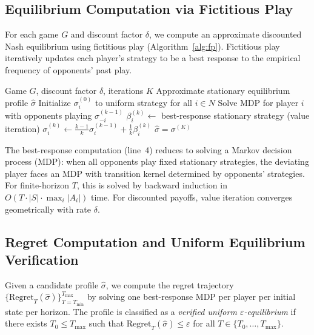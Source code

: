 \documentclass[11pt,a4paper]{article}
\theoremstyle{definition}
\newcommand{\eps}{\varepsilon}
\newcommand{\Regret}{\mathrm{Regret}}
\begin{document}
\subsection{Equilibrium Computation via Fictitious Play}\label{sec:method:fp}

For each game $G$ and discount factor $\delta$, we compute an approximate discounted Nash equilibrium using fictitious play (Algorithm~\ref{alg:fp}).
Fictitious play iteratively updates each player's strategy to be a best response to the empirical frequency of opponents' past play.

\begin{algorithm}[t]
\caption{Fictitious Play for Discounted Stochastic Games}\label{alg:fp}
\begin{algorithmic}[1]
\REQUIRE Game $G$, discount factor $\delta$, iterations $K$
\ENSURE Approximate stationary equilibrium profile $\hat{\sigma}$
\STATE Initialize $\sigma_i^{(0)}$ to uniform strategy for all $i \in N$
        \STATE Solve MDP for player $i$ with opponents playing $\sigma_{-i}^{(k-1)}$
        \STATE $\beta_i^{(k)} \leftarrow$ best-response stationary strategy (value iteration)
        \STATE $\sigma_i^{(k)} \leftarrow \frac{k-1}{k} \sigma_i^{(k-1)} + \frac{1}{k} \beta_i^{(k)}$
    \ENDFOR
\ENDFOR
\RETURN $\hat{\sigma} = \sigma^{(K)}$
\end{algorithmic}
\end{algorithm}

The best-response computation (line~4) reduces to solving a Markov decision process (MDP): when all opponents play fixed stationary strategies, the deviating player faces an MDP with transition kernel determined by opponents' strategies.
For finite-horizon $T$, this is solved by backward induction in $O(T \cdot |S| \cdot \max_i |A_i|)$ time.
For discounted payoffs, value iteration converges geometrically with rate $\delta$.

\subsection{Regret Computation and Uniform Equilibrium Verification}\label{sec:method:regret}

Given a candidate profile $\hat{\sigma}$, we compute the regret trajectory $\{\Regret_T(\hat{\sigma})\}_{T=T_{\min}}^{T_{\max}}$ by solving one best-response MDP per player per initial state per horizon.
The profile is classified as a \emph{verified uniform $\eps$-equilibrium} if there exists $T_0 \leq T_{\max}$ such that $\Regret_T(\hat{\sigma}) \leq \eps$ for all $T \in \{T_0, \ldots, T_{\max}\}$.
\end{document}
